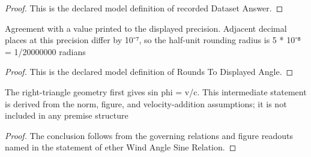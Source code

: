\begin{proof}
  This is the declared model definition of recorded Dataset Answer.
\end{proof}
\begin{definition}
  \label{def:physics:phyx-mini-0524:phyxminiproblems-problemphyxmini0524-roundstodisplayedangle}
  Agreement with a value printed to the displayed precision. Adjacent decimal places at this precision differ by 10⁻⁷, so the half-unit rounding radius is 5 * 10⁻⁸ = 1/20000000 radians
\end{definition}
\begin{proof}
  This is the declared model definition of Rounds To Displayed Angle.
\end{proof}
\begin{lemma}
  \label{lem:physics:phyx-mini-0524:phyxminiproblems-problemphyxmini0524-etherwindanglesinerelation}
  The right-triangle geometry first gives sin phi = v/c. This intermediate statement is derived from the norm, figure, and velocity-addition assumptions; it is not included in any premise structure
\end{lemma}
\begin{proof}
  The conclusion follows from the governing relations and figure readouts named in the statement of ether Wind Angle Sine Relation.
\end{proof}
